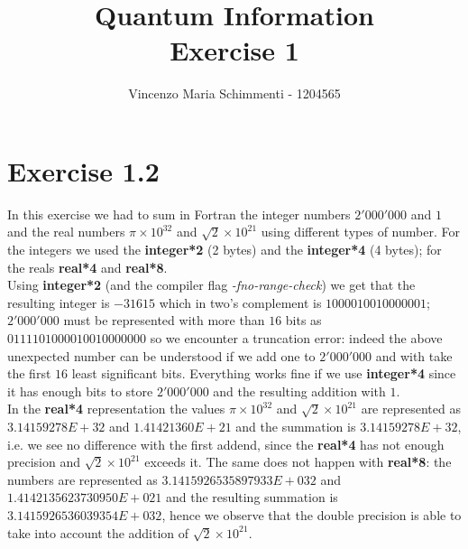 \documentclass[a4paper,12pt]{article}
\title{%
	Quantum Information \\
	\large Exercise 1 \\
}
\author{Vincenzo Maria Schimmenti - 1204565}
\begin{document}
\sloppy
	
	
\maketitle

\section*{Exercise 1.2}
In this exercise we had to sum in Fortran the integer numbers $2'000'000$ and $1$ and the real numbers $\pi \times 10^{32}$ and $\sqrt{2} \times 10^{21}$ using different types of number. For the integers we used the \textbf{integer*2} (2 bytes) and the \textbf{integer*4} (4 bytes); for the reals \textbf{real*4} and \textbf{real*8}.\\
Using \textbf{integer*2} (and the compiler flag \textit{-fno-range-check}) we get that the resulting integer is $-31615$ which in two's complement is $1000010010000001$; $2'000'000$ must be represented with more than $16$ bits as $0111101000010010000000$ so we encounter a truncation error: indeed the above unexpected number can be understood if we add one to $2'000'000$  and with take the first $16$ least significant bits. Everything works fine if we use \textbf{integer*4} since it has enough bits to store $2'000'000$ and the resulting addition with $1$. \\
In the \textbf{real*4} representation the values $\pi \times 10^{32}$ and $\sqrt{2} \times 10^{21}$ are represented as $3.14159278E+32$ and $1.41421360E+21$ and the summation is $3.14159278E+32$, i.e. we see no difference with the first addend, since the \textbf{real*4} has not enough precision and $\sqrt{2} \times 10^{21}$ exceeds it. The same does not happen with \textbf{real*8}: the numbers are represented as $3.1415926535897933E+032$ and $1.4142135623730950E+021$ and the resulting summation is $3.1415926536039354E+032$, hence we observe that the double precision is able to take into account the addition of $\sqrt{2} \times 10^{21}$.
\end{document}
